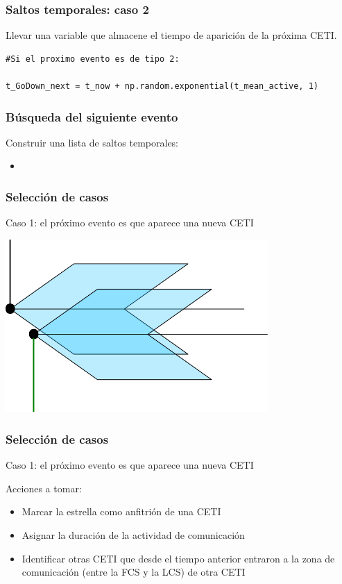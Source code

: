 \documentclass[handout]{beamer}
\theoremstyle{plain}
\theoremstyle{definition}
\theoremstyle{remark}
\begin{document}
\begin{frame}[fragile]
\frametitle{Saltos temporales: caso 2}

Llevar una variable que almacene el tiempo de aparición de la próxima
CETI.
       
\begin{lstlisting}
#Si el proximo evento es de tipo 2:

t_GoDown_next = t_now + np.random.exponential(t_mean_active, 1)

\end{lstlisting}       

\end{frame}
 
\begin{frame}\frametitle{Búsqueda del siguiente evento}

   Construir una lista de saltos temporales:

   \begin{itemize}
      \item 
   \end{itemize}

\end{frame}  %
                    
 

 



\begin{frame}\frametitle{Selección de casos}
   Caso 1: el próximo evento es que aparece una nueva CETI
   \bigskip

\centering
\includegraphics[width=0.75\textwidth]{path5908-5.png}
\end{frame}
 
\begin{frame}\frametitle{Selección de casos}
   Caso 1: el próximo evento es que aparece una nueva CETI

   Acciones a tomar:

   \begin{itemize}
      \item Marcar la estrella como anfitrión de una CETI
      \item Asignar la duración de la actividad de comunicación
      \item Identificar otras CETI que desde el tiempo anterior
         entraron a la zona de comunicación (entre la FCS y la LCS) de
         otra CETI
   \end{itemize}
\end{frame}
\end{document}
